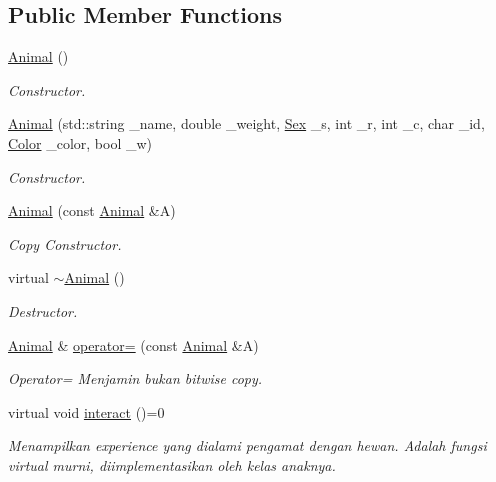 \subsection*{Public Member Functions}
\begin{DoxyCompactItemize}
\item 
\hyperlink{classAnimal_a1e726a49ec952443190ac62dad22353c}{Animal} ()
\begin{DoxyCompactList}\small\item\em Constructor. \end{DoxyCompactList}\item 
\hyperlink{classAnimal_a84c6d203680b00cb07f2ec48f680ed45}{Animal} (std\+::string \+\_\+name, double \+\_\+weight, \hyperlink{sex_8h_a2633cb393c68bb2ee8080db58fb7ba93}{Sex} \+\_\+s, int \+\_\+r, int \+\_\+c, char \+\_\+id, \hyperlink{color_8h_ab87bacfdad76e61b9412d7124be44c1c}{Color} \+\_\+color, bool \+\_\+w)
\begin{DoxyCompactList}\small\item\em Constructor. \end{DoxyCompactList}\item 
\hyperlink{classAnimal_a97b35f0ad64b9a45c24330d47a164c84}{Animal} (const \hyperlink{classAnimal}{Animal} \&A)
\begin{DoxyCompactList}\small\item\em Copy Constructor. \end{DoxyCompactList}\item 
virtual \hyperlink{classAnimal_a476af25adde5f0dfa688129c8f86fa5c}{$\sim$\+Animal} ()
\begin{DoxyCompactList}\small\item\em Destructor. \end{DoxyCompactList}\item 
\hyperlink{classAnimal}{Animal} \& \hyperlink{classAnimal_a57ae10591202bc5bcc5df2af25d63b34}{operator=} (const \hyperlink{classAnimal}{Animal} \&A)
\begin{DoxyCompactList}\small\item\em Operator= Menjamin bukan bitwise copy. \end{DoxyCompactList}\item 
virtual void \hyperlink{classAnimal_af47626b050b665e9a19525227d2b840f}{interact} ()=0
\begin{DoxyCompactList}\small\item\em Menampilkan experience yang dialami pengamat dengan hewan. Adalah fungsi virtual murni, diimplementasikan oleh kelas anaknya. \end{DoxyCompactList}\item 

\end{DoxyCompactItemize}
